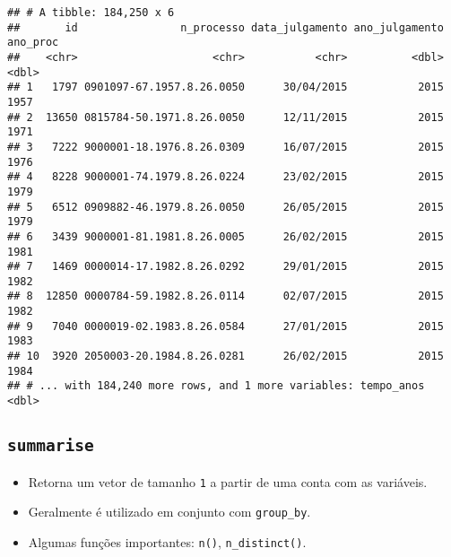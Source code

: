 \documentclass[]{book}
\providecommand{\tightlist}{%
  \setlength{\itemsep}{0pt}\setlength{\parskip}{0pt}}
\begin{document}
\begin{verbatim}
## # A tibble: 184,250 x 6
##       id                n_processo data_julgamento ano_julgamento ano_proc
##    <chr>                     <chr>           <chr>          <dbl>    <dbl>
## 1   1797 0901097-67.1957.8.26.0050      30/04/2015           2015     1957
## 2  13650 0815784-50.1971.8.26.0050      12/11/2015           2015     1971
## 3   7222 9000001-18.1976.8.26.0309      16/07/2015           2015     1976
## 4   8228 9000001-74.1979.8.26.0224      23/02/2015           2015     1979
## 5   6512 0909882-46.1979.8.26.0050      26/05/2015           2015     1979
## 6   3439 9000001-81.1981.8.26.0005      26/02/2015           2015     1981
## 7   1469 0000014-17.1982.8.26.0292      29/01/2015           2015     1982
## 8  12850 0000784-59.1982.8.26.0114      02/07/2015           2015     1982
## 9   7040 0000019-02.1983.8.26.0584      27/01/2015           2015     1983
## 10  3920 2050003-20.1984.8.26.0281      26/02/2015           2015     1984
## # ... with 184,240 more rows, and 1 more variables: tempo_anos <dbl>
\end{verbatim}

\subsection{\texorpdfstring{\texttt{summarise}}{summarise}}\label{summarise}

\begin{itemize}
\tightlist
\item
  Retorna um vetor de tamanho \texttt{1} a partir de uma conta com as
  variáveis.
\item
  Geralmente é utilizado em conjunto com \texttt{group\_by}.
\item
  Algumas funções importantes: \texttt{n()}, \texttt{n\_distinct()}.
\end{itemize}
\end{document}
